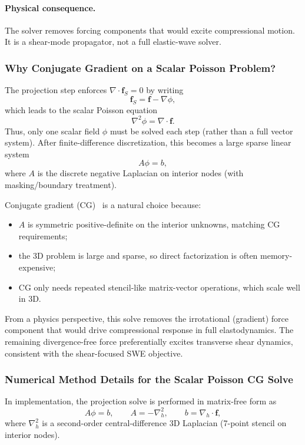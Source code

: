\documentclass[11pt]{article}
\begin{document}
\paragraph{Physical consequence.}
The solver removes forcing components that would excite compressional motion. It is a shear-mode propagator, not a full elastic-wave solver.

\subsubsection{Why Conjugate Gradient on a Scalar Poisson Problem?}
The projection step enforces $\nabla\cdot\bm{f}_S=0$ by writing
\begin{equation}
\bm{f}_S = \bm{f} - \nabla\phi,
\end{equation}
which leads to the scalar Poisson equation
\begin{equation}
\nabla^2\phi = \nabla\cdot\bm{f}.
\end{equation}
Thus, only one scalar field $\phi$ must be solved each step (rather than a full vector system). After finite-difference discretization, this becomes a large sparse linear system
\begin{equation}
A\phi=b,
\end{equation}
where $A$ is the discrete negative Laplacian on interior nodes (with masking/boundary treatment).

Conjugate gradient (CG)~\cite{shewchuk1994conjugate,golub2013matrix} is a natural choice because:
\begin{itemize}[leftmargin=1.5em]
\item $A$ is symmetric positive-definite on the interior unknowns, matching CG requirements;
\item the 3D problem is large and sparse, so direct factorization is often memory-expensive;
\item CG only needs repeated stencil-like matrix-vector operations, which scale well in 3D.
\end{itemize}

From a physics perspective, this solve removes the irrotational (gradient) force component that would drive compressional response in full elastodynamics. The remaining divergence-free force preferentially excites transverse shear dynamics, consistent with the shear-focused SWE objective.

\subsubsection{Numerical Method Details for the Scalar Poisson CG Solve}
In implementation, the projection solve is performed in matrix-free form as
\begin{equation}
A\phi=b, \qquad A=-\nabla_h^2, \qquad b=\nabla_h\cdot\bm{f},
\end{equation}
where $\nabla_h^2$ is a second-order central-difference 3D Laplacian (7-point stencil on interior nodes).
\end{document}
